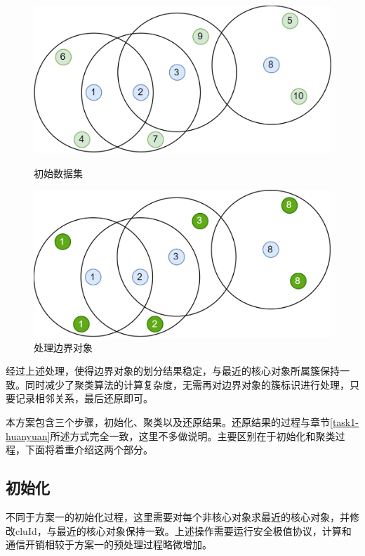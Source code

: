 \begin{figure}[!h]
	\begin{minipage}[t]{0.48\linewidth}
		\centering
		\includegraphics[width=\linewidth]{img/db1.png}
		\caption{初始数据集}
		\label{redata1}
	\end{minipage}
	\hfill
	\begin{minipage}[t]{0.48\linewidth}
		\centering
		\includegraphics[width=\linewidth]{img/redbscan.png}
		\caption{处理边界对象}
		\label{redata2}
	\end{minipage}
\end{figure}

经过上述处理，使得边界对象的划分结果稳定，与最近的核心对象所属簇保持一致。同时减少了聚类算法的计算复杂度，无需再对边界对象的簇标识进行处理，只要记录相邻关系，最后还原即可。

本方案包含三个步骤，初始化、聚类以及还原结果。还原结果的过程与章节\ref{task1-huanyuan}所述方式完全一致，这里不多做说明。主要区别在于初始化和聚类过程，下面将着重介绍这两个部分。

\subsection{初始化}
不同于方案一的初始化过程，这里需要对每个非核心对象求最近的核心对象，并修改cluId，与最近的核心对象保持一致。上述操作需要运行安全极值协议，计算和通信开销相较于方案一的预处理过程略微增加。

